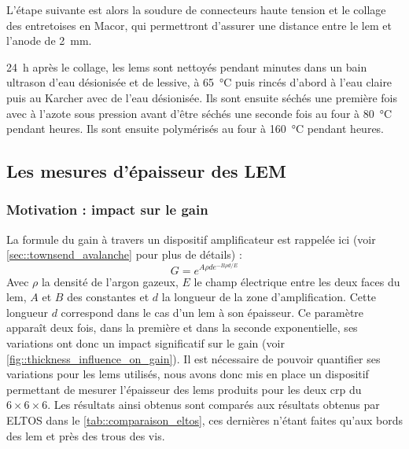             L'étape suivante est alors la soudure de connecteurs haute tension et le collage des entretoises en Macor, qui permettront d'assurer une distance entre le \gls{lem} et l'anode de \SI{2}{\milli\meter}.
            
            \SI{24}{\hour} après le collage, les \glspl{lem} sont nettoyés pendant  minutes dans un bain ultrason d'eau désionisée et de lessive, à \SI{65}{\celsius} puis rincés d'abord à l'eau claire puis au Karcher avec de l'eau désionisée. Ils sont ensuite séchés une première fois avec à l'azote sous pression avant d'être séchés une seconde fois au four à \SI{80}{\celsius} pendant  heures. Ils sont ensuite polymérisés au four à \SI{160}{\celsius} pendant  heures.
        
        \subsection{Les mesures d’épaisseur des LEM}\label{sec::epaisseur}
        
            \subsubsection{Motivation : impact sur le gain}
            
                La formule du gain à travers un dispositif amplificateur est rappelée ici (voir \autoref{sec::townsend_avalanche} pour plus de détails) :
                \begin{equation}\label{eq::townsend_avalanche_2}
                    G = e^{A\rho d e^{-B\rho d/E}}
                \end{equation}
                Avec $\rho$ la densité de l'argon gazeux, $E$ le champ électrique entre les deux faces du \gls{lem}, $A$ et $B$ des constantes et $d$ la longueur de la zone d'amplification. Cette longueur $d$ correspond dans le cas d'un \gls{lem} à son épaisseur. Ce paramètre apparaît deux fois, dans la première et dans la seconde exponentielle, ses variations ont donc un impact significatif sur le gain (voir \autoref{fig::thickness_influence_on_gain}). Il est nécessaire de pouvoir quantifier ses variations pour les \glspl{lem} utilisés, nous avons donc mis en place un dispositif permettant de mesurer l'épaisseur des \glspl{lem} produits pour les deux \gls{crp} du $6\times6\times6$. Les résultats ainsi obtenus sont comparés aux résultats obtenus par ELTOS dans le \autoref{tab::comparaison_eltos}, ces dernières n'étant faites qu'aux bords des \gls{lem} et près des trous des vis.
                
